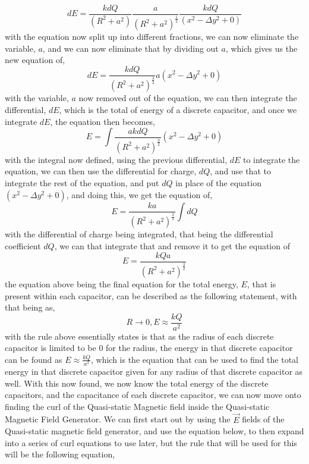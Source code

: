 \documentclass[]{article}
\begin{document}
\begin{equation}
dE = \frac{kdQ}{(R^2 + a^2)} \frac{a}{(R^2+a^2)^\frac{1}{2}}\frac{kdQ}{(x^2-\Delta{y}^2+0)}
\end{equation}
with the equation now split up into different fractions, we can now eliminate the variable, $a$, and we can now eliminate that by dividing out $a$, which gives us the new equation of,
\begin{equation}
dE = \frac{kdQ}{(R^2+a^2)^\frac{3}{2}} a(x^2-\Delta{y}^2+0)
\end{equation}
with the variable, $a$ now removed out of the equation, we can then integrate the differential, $dE$, which is the total of energy of a discrete capacitor, and once we integrate $dE$, the equation then becomes, 
\begin{equation}
E = \int \frac{akdQ}{(R^2+a^2)^\frac{3}{2}} (x^2 - \Delta{y}^2 + 0)
\end{equation}
with the integral now defined, using the previous differential, $dE$ to integrate the equation, we can then use the differential for charge, $dQ$, and use that to integrate the rest of the equation, and put $dQ$ in place of the equation $(x^2-\Delta{y}^2+0)$, and doing this, we get the equation of,
\begin{equation}
E = \frac{ka}{(R^2+a^2)^\frac{3}{2}} \int dQ
\end{equation}
with the differential of charge being integrated, that being the differential coefficient $dQ$, we can that integrate that and remove it to get the equation of
\begin{equation}
E = \frac{kQa}{(R^2+a^2)^\frac{3}{2}}
\end{equation}
the equation above being the final equation for the total energy, $E$, that is present within each capacitor, can be described as the following statement, with that being as,
\begin{equation}
R \rightarrow 0, E \approx \frac{kQ}{a^2}
\end{equation}
with the rule above essentially states is that as the radius of each discrete capacitor is limited to be 0 for the radius, the energy in that discrete capacitor can be found as $E \approx \frac{kQ}{a^2}$, which is the equation that can be used to find the total energy in that discrete capacitor given for any radius of that discrete capacitor as well. With this now found, we now know the total energy of the discrete capacitors, and the capacitance of each discrete capacitor, we can now move onto finding the curl of the Quasi-static Magnetic field inside the Quasi-static Magnetic Field Generator. We can first start out by using the $\vec{E}$ fields of the Quasi-static magnetic field generator, and use the equation below, to then expand into a series of curl equations to use later, but the rule that will be used for this will be the following equation,
\end{document}
